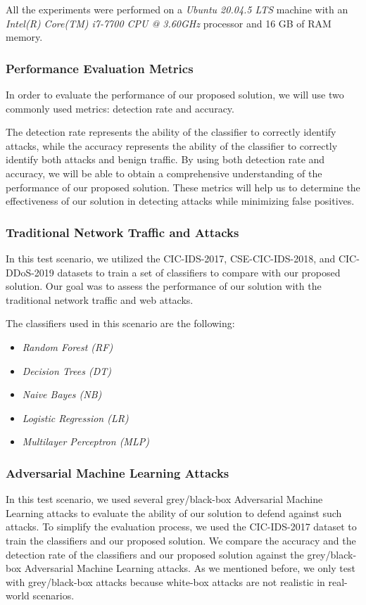All the experiments were performed on a \textit{Ubuntu 20.04.5 LTS} machine with an
\textit{Intel(R) Core(TM) i7-7700 CPU @ 3.60GHz} processor and 16 GB of RAM memory.


\subsubsection{Performance Evaluation Metrics}
In order to evaluate the performance of our proposed solution, we will use two commonly used metrics: detection rate
and accuracy.

The detection rate represents the ability of the classifier to correctly identify attacks, while the accuracy represents
the ability of the classifier to correctly identify both attacks and benign traffic.
By using both detection rate and accuracy, we will be able to obtain a comprehensive understanding of the performance
of our proposed solution.
These metrics will help us to determine the effectiveness of our solution in detecting attacks while minimizing false
positives.

\subsubsection{Traditional Network Traffic and Attacks}
In this test scenario, we utilized the CIC-IDS-2017, CSE-CIC-IDS-2018, and CIC-DDoS-2019 datasets to train a set
of classifiers to compare with our proposed solution.
Our goal was to assess the performance of our solution with the traditional network traffic and web attacks.

The classifiers used in this scenario are the following:

\begin{itemize}
    \item \textit{Random Forest (RF)}
    \item \textit{Decision Trees (DT)}
    \item \textit{Naive Bayes (NB)}
    \item \textit{Logistic Regression (LR)}
    \item \textit{Multilayer Perceptron (MLP)}
\end{itemize}

\subsubsection{Adversarial Machine Learning Attacks}

In this test scenario, we used several grey/black-box Adversarial Machine Learning attacks to evaluate the ability of
our solution to defend against such attacks.
To simplify the evaluation process, we used the CIC-IDS-2017 dataset to train the classifiers and our proposed solution.
We compare the accuracy and the detection rate of the classifiers and our proposed solution against the grey/black-box
Adversarial Machine Learning attacks.
As we mentioned before, we only test with grey/black-box attacks because white-box attacks are not realistic in
real-world scenarios.

